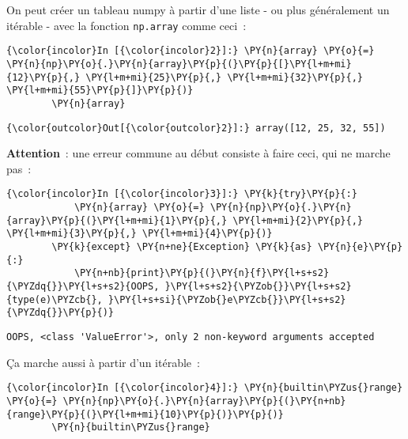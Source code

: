    On peut créer un tableau numpy à partir d'une liste - ou plus
généralement un itérable - avec la fonction \texttt{np.array} comme
ceci~:

    \begin{Verbatim}[commandchars=\\\{\}]
{\color{incolor}In [{\color{incolor}2}]:} \PY{n}{array} \PY{o}{=} \PY{n}{np}\PY{o}{.}\PY{n}{array}\PY{p}{(}\PY{p}{[}\PY{l+m+mi}{12}\PY{p}{,} \PY{l+m+mi}{25}\PY{p}{,} \PY{l+m+mi}{32}\PY{p}{,} \PY{l+m+mi}{55}\PY{p}{]}\PY{p}{)}
        \PY{n}{array}
\end{Verbatim}


\begin{Verbatim}[commandchars=\\\{\}]
{\color{outcolor}Out[{\color{outcolor}2}]:} array([12, 25, 32, 55])
\end{Verbatim}
            
    \textbf{Attention}~: une erreur commune au début consiste à faire ceci,
qui ne marche pas~:

    \begin{Verbatim}[commandchars=\\\{\}]
{\color{incolor}In [{\color{incolor}3}]:} \PY{k}{try}\PY{p}{:}
            \PY{n}{array} \PY{o}{=} \PY{n}{np}\PY{o}{.}\PY{n}{array}\PY{p}{(}\PY{l+m+mi}{1}\PY{p}{,} \PY{l+m+mi}{2}\PY{p}{,} \PY{l+m+mi}{3}\PY{p}{,} \PY{l+m+mi}{4}\PY{p}{)}
        \PY{k}{except} \PY{n+ne}{Exception} \PY{k}{as} \PY{n}{e}\PY{p}{:}
            \PY{n+nb}{print}\PY{p}{(}\PY{n}{f}\PY{l+s+s2}{\PYZdq{}}\PY{l+s+s2}{OOPS, }\PY{l+s+s2}{\PYZob{}}\PY{l+s+s2}{type(e)\PYZcb{}, }\PY{l+s+si}{\PYZob{}e\PYZcb{}}\PY{l+s+s2}{\PYZdq{}}\PY{p}{)}
\end{Verbatim}


    \begin{Verbatim}[commandchars=\\\{\}]
OOPS, <class 'ValueError'>, only 2 non-keyword arguments accepted

    \end{Verbatim}

    Ça marche aussi à partir d'un itérable~:

    \begin{Verbatim}[commandchars=\\\{\}]
{\color{incolor}In [{\color{incolor}4}]:} \PY{n}{builtin\PYZus{}range} \PY{o}{=} \PY{n}{np}\PY{o}{.}\PY{n}{array}\PY{p}{(}\PY{n+nb}{range}\PY{p}{(}\PY{l+m+mi}{10}\PY{p}{)}\PY{p}{)}
        \PY{n}{builtin\PYZus{}range}
\end{Verbatim}


